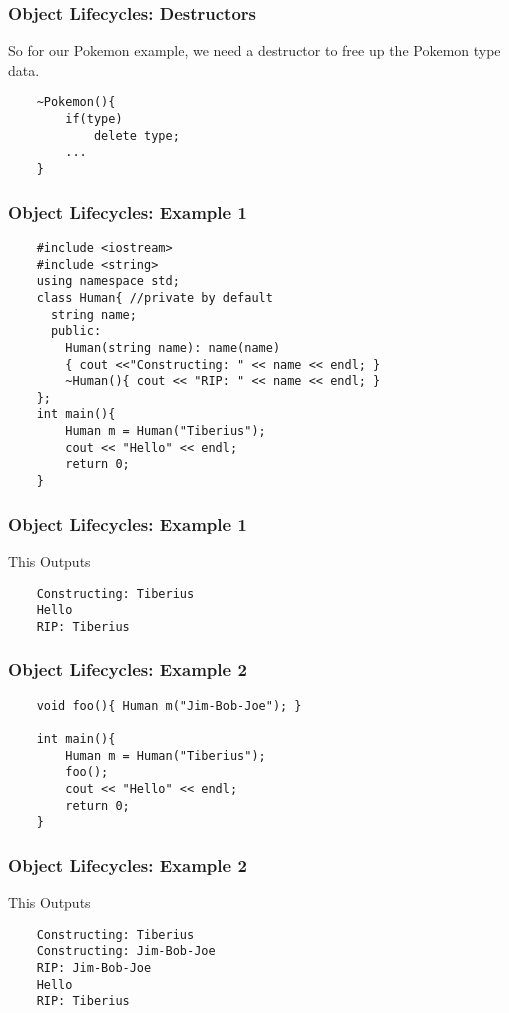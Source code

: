 \documentclass{beamer}
\begin{document}
\begin{frame}[fragile]
    \frametitle{Object Lifecycles: Destructors}
    So for our Pokemon example, we need a destructor to free up the Pokemon type data.

    \begin{verbatim}
    ~Pokemon(){ 
        if(type) 
            delete type;
        ...
    }
    \end{verbatim}
\end{frame}

\begin{frame}[fragile]
    \frametitle{Object Lifecycles: Example 1}
    \begin{verbatim}
    #include <iostream>
    #include <string>
    using namespace std;
    class Human{ //private by default
      string name;
      public:
        Human(string name): name(name) 
        { cout <<"Constructing: " << name << endl; }
        ~Human(){ cout << "RIP: " << name << endl; }
    };
    int main(){
        Human m = Human("Tiberius");
        cout << "Hello" << endl;
        return 0;
    }
    \end{verbatim}
\end{frame}
\begin{frame}[fragile]
    \frametitle{Object Lifecycles: Example 1}
    This Outputs
    \begin{verbatim}
    Constructing: Tiberius
    Hello
    RIP: Tiberius
    \end{verbatim}

\end{frame}

\begin{frame}[fragile]
    \frametitle{Object Lifecycles: Example 2}
    \begin{verbatim}
    void foo(){ Human m("Jim-Bob-Joe"); }

    int main(){
        Human m = Human("Tiberius");
        foo();
        cout << "Hello" << endl;
        return 0;
    }
    \end{verbatim}
\end{frame}
\begin{frame}[fragile]
    \frametitle{Object Lifecycles: Example 2}
    This Outputs
    \begin{verbatim}
    Constructing: Tiberius
    Constructing: Jim-Bob-Joe
    RIP: Jim-Bob-Joe
    Hello
    RIP: Tiberius
    \end{verbatim}

\end{frame}
\end{document}

